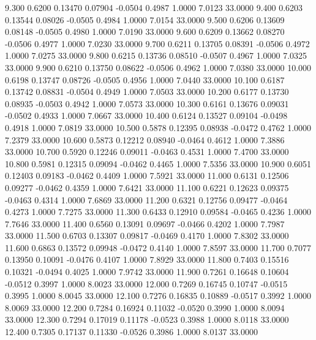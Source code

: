    9.300   0.6200   0.13470   0.07904  -0.0504   0.4987   1.0000   7.0123  33.0000
   9.400   0.6203   0.13544   0.08026  -0.0505   0.4984   1.0000   7.0154  33.0000
   9.500   0.6206   0.13609   0.08148  -0.0505   0.4980   1.0000   7.0190  33.0000
   9.600   0.6209   0.13662   0.08270  -0.0506   0.4977   1.0000   7.0230  33.0000
   9.700   0.6211   0.13705   0.08391  -0.0506   0.4972   1.0000   7.0275  33.0000
   9.800   0.6215   0.13736   0.08510  -0.0507   0.4967   1.0000   7.0325  33.0000
   9.900   0.6210   0.13750   0.08622  -0.0506   0.4962   1.0000   7.0380  33.0000
  10.000   0.6198   0.13747   0.08726  -0.0505   0.4956   1.0000   7.0440  33.0000
  10.100   0.6187   0.13742   0.08831  -0.0504   0.4949   1.0000   7.0503  33.0000
  10.200   0.6177   0.13730   0.08935  -0.0503   0.4942   1.0000   7.0573  33.0000
  10.300   0.6161   0.13676   0.09031  -0.0502   0.4933   1.0000   7.0667  33.0000
  10.400   0.6124   0.13527   0.09104  -0.0498   0.4918   1.0000   7.0819  33.0000
  10.500   0.5878   0.12395   0.08938  -0.0472   0.4762   1.0000   7.2379  33.0000
  10.600   0.5873   0.12212   0.08940  -0.0464   0.4612   1.0000   7.3886  33.0000
  10.700   0.5920   0.12246   0.09011  -0.0463   0.4531   1.0000   7.4700  33.0000
  10.800   0.5981   0.12315   0.09094  -0.0462   0.4465   1.0000   7.5356  33.0000
  10.900   0.6051   0.12403   0.09183  -0.0462   0.4409   1.0000   7.5921  33.0000
  11.000   0.6131   0.12506   0.09277  -0.0462   0.4359   1.0000   7.6421  33.0000
  11.100   0.6221   0.12623   0.09375  -0.0463   0.4314   1.0000   7.6869  33.0000
  11.200   0.6321   0.12756   0.09477  -0.0464   0.4273   1.0000   7.7275  33.0000
  11.300   0.6433   0.12910   0.09584  -0.0465   0.4236   1.0000   7.7646  33.0000
  11.400   0.6560   0.13091   0.09697  -0.0466   0.4202   1.0000   7.7987  33.0000
  11.500   0.6703   0.13307   0.09817  -0.0469   0.4170   1.0000   7.8302  33.0000
  11.600   0.6863   0.13572   0.09948  -0.0472   0.4140   1.0000   7.8597  33.0000
  11.700   0.7077   0.13950   0.10091  -0.0476   0.4107   1.0000   7.8929  33.0000
  11.800   0.7403   0.15516   0.10321  -0.0494   0.4025   1.0000   7.9742  33.0000
  11.900   0.7261   0.16648   0.10604  -0.0512   0.3997   1.0000   8.0023  33.0000
  12.000   0.7269   0.16745   0.10747  -0.0515   0.3995   1.0000   8.0045  33.0000
  12.100   0.7276   0.16835   0.10889  -0.0517   0.3992   1.0000   8.0069  33.0000
  12.200   0.7284   0.16924   0.11032  -0.0520   0.3990   1.0000   8.0094  33.0000
  12.300   0.7294   0.17019   0.11178  -0.0523   0.3988   1.0000   8.0118  33.0000
  12.400   0.7305   0.17137   0.11330  -0.0526   0.3986   1.0000   8.0137  33.0000
